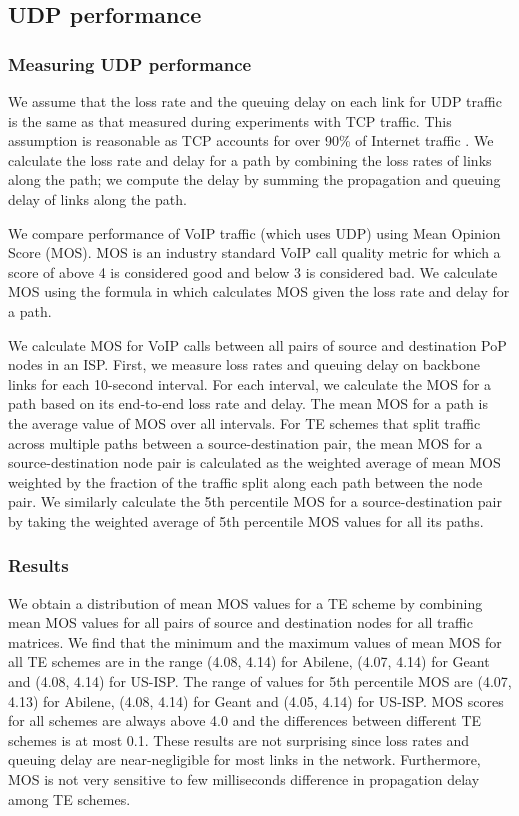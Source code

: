 \subsection{UDP performance}
\label{sec:UDP_perf}
\subsubsection{Measuring UDP performance}

We assume that the loss rate and the queuing delay on each link for UDP traffic is the same as that measured during experiments with TCP traffic. This assumption is reasonable as TCP accounts for over 90\% of Internet traffic \cite{SprintBackbone}. We calculate the loss rate and delay for a path by combining the loss rates of links along the path; we compute the delay by summing the propagation and queuing delay of links along the path.

We compare performance of VoIP traffic (which uses UDP) using Mean Opinion Score (MOS). MOS is an industry standard VoIP call quality metric for which a score of above 4 is considered good and below 3 is considered bad. We calculate MOS using the formula in \cite{MOS-formula}  which calculates MOS given the loss rate and delay for a path. 

We calculate MOS for VoIP calls between all pairs of source and destination PoP nodes in an ISP. First, we measure loss rates and queuing delay on backbone links for each 10-second interval.  For each interval, we calculate the MOS for a path based on its end-to-end loss rate and delay. The mean MOS for a path is the average value of MOS over all intervals. For TE schemes that split traffic across multiple paths between a source-destination pair, the mean MOS for a source-destination node pair is calculated as the weighted average of mean MOS weighted by the fraction of the traffic split along each path between the node pair. We similarly calculate the 5th percentile MOS for a source-destination pair by taking the weighted average of 5th percentile MOS values for all its paths.

\subsubsection{Results}
We obtain a distribution of mean MOS values for a TE scheme by combining mean MOS values for all pairs of source and destination nodes for all traffic matrices. We find that the minimum and the maximum values of mean MOS for all TE schemes are in the range (4.08, 4.14) for Abilene, (4.07, 4.14) for Geant and (4.08, 4.14) for US-ISP.  The range of values for 5th percentile MOS are (4.07, 4.13) for Abilene, (4.08, 4.14) for Geant and (4.05, 4.14) for US-ISP. MOS scores for all schemes are always above 4.0 and the differences between different TE schemes is at most 0.1. These results are not surprising since loss rates and queuing delay are near-negligible for most links in the network. Furthermore, MOS is not very sensitive to few milliseconds difference in propagation delay among TE schemes.




